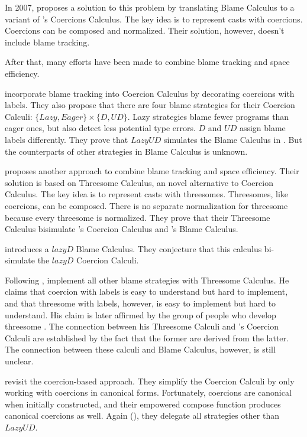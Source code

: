 \documentclass[acmsmall,review,anonymous]{acmart}\settopmatter{printfolios=true,printccs=false,printacmref=false}
\begin{document}
In 2007, \citet{herman2010space} proposes a solution to this problem by 
translating Blame Calculus to a variant of \citet{henglein1994dynamic}'s 
Coercions Calculus. The key idea is to represent casts with coercions. 
Coercions can be composed and normalized. Their solution, however, doesn't 
include blame tracking. 

After that, many efforts have been made to combine blame tracking and 
space efficiency. 

\citet{siek2009exploring} incorporate blame tracking into Coercion Calculus by 
decorating coercions with labels. They also propose that there are four blame 
strategies for their Coercion Calculi:
$ \{Lazy, Eager\} \times \{D, UD\} $. 
Lazy strategies blame fewer programs than eager ones,
but also detect less potential type errors.
$ D $ and $ UD $ assign blame labels differently.
They prove that $ Lazy UD $ simulates the Blame Calculus in 
\cite{wadler2009well}. But the counterparts of other strategies in Blame 
Calculus is unknown.

\citet{siek2010threesomes} proposes another approach to combine blame 
tracking and space efficiency. Their solution is based on Threesome Calculus, 
an novel alternative to Coercion Calculus. The key idea is to represent casts 
with threesomes. Threesomes, like coercions, can be composed. There is no 
separate normalization for threesome because every threesome is normalized. 
They prove that their Threesome Calculus bisimulate 
\citet{siek2009exploring}'s Coercion Calculus and
\citet{wadler2009well}'s Blame Calculus.

\citet{siek2012interpretations} introduces a $ lazy D $  Blame Calculus. They 
conjecture that this calculus bi-simulate the $ lazy D $ Coercion Calculi.

Following \citet{siek2010threesomes}, \citet{garcia2013calculating} 
implement all other blame strategies with Threesome Calculus. 
He claims that 
coercion with labels is easy to understand but hard to implement, 
and that 
threesome with labels, however, is easy to implement but hard to understand.
His claim is later affirmed by the group of people who develop threesome 
\citet{siek2015blame}. 
The connection 
between his Threesome Calculi and \citet{siek2009exploring}'s Coercion 
Calculi are established by the fact that the former are derived from the latter.
The connection between these calculi and Blame Calculus, however, 
is still unclear.

\citet{siek2015blame} revisit the coercion-based approach. They simplify the 
Coercion Calculi by only working with coercions in canonical forms.
Fortunately, coercions are canonical when initially constructed, and 
their empowered compose function produces canonical coercions as well. Again 
(\citet{siek2010threesomes}), they delegate all strategies other than 
$ Lazy UD $.
\end{document}
